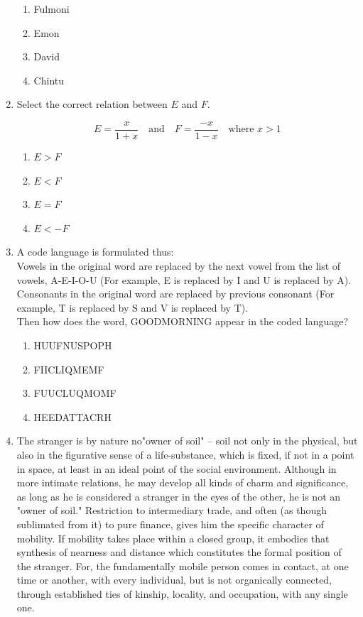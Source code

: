\documentclass[journal,13pt,onecolumn]{exam}
\theoremstyle{remark}
\begin{document}
\begin{enumerate}[label=Q.\arabic*]
\begin{enumerate}
    \item Fulmoni
    \item Emon
    \item David
    \item Chintu
\end{enumerate}

\item Select the correct relation between $E$ and $F$.

\[
E = \frac{x}{1+x} \quad \text{and} \quad F = \frac{-x}{1-x} \quad \text{where } x > 1
\]

\begin{enumerate}
    \item $E > F$
    \item $E < F$
    \item $E = F$
    \item $E < -F$
\end{enumerate}

\item A code language is formulated thus:\\

Vowels in the original word are replaced by the next vowel from the list of vowels, A-E-I-O-U (For example, E is replaced by I and U is replaced by A). Consonants in the original word are replaced by previous consonant (For example, T is replaced by S and V is replaced by T).\\

Then how does the word, GOODMORNING appear in the coded language?

\begin{enumerate}
    \item HUUFNUSPOPH
    \item FIICLIQMEMF
    \item FUUCLUQMOMF
    \item HEEDATTACRH
\end{enumerate}

\newpage

\item  The stranger is by nature no"owner of soil" -- soil not only in the physical, but also in the figurative sense of a life-substance, which is fixed, if not in a point in space, at least in an ideal point of the social environment. Although in more intimate relations, he may develop all kinds of charm and significance, as long as he is considered a stranger in the eyes of the other, he is not an "owner of soil." Restriction to intermediary trade, and often (as though sublimated from it) to pure finance, gives him the specific character of mobility. If mobility takes place within a closed group, it embodies that synthesis of nearness and distance which constitutes the formal position of the stranger. For, the fundamentally mobile person comes in contact, at one time or another, with every individual, but is not organically connected, through established ties of kinship, locality, and occupation, with any single one.\\


\end{enumerate}
\end{document}
